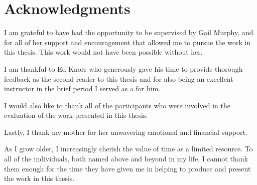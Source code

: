 
\chapter{Acknowledgments}

I am grateful to have had the opportunity to be supervised by Gail Murphy,
and for all of her support and encouragement that allowed me to pursue the work in this thesis.
This work would not have been possible without her.

I am thankful to Ed Knorr who generously gave his time to provide thorough feedback as the second reader to this thesis
and for also being an excellent instructor in the brief period I served as a  for him.

I would also like to thank all of the participants who were involved in the evaluation of the work presented in this thesis.

Lastly, I thank my mother for her unwavering emotional and financial support.

As I grow older, I increasingly cherish the value of time as a limited resource.
To all of the individuals, both named above and beyond in my life,
I cannot thank them enough for the time they have given me in helping to produce and present the work in this thesis.